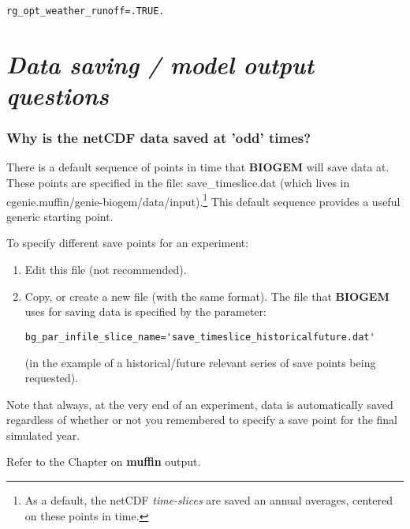 \documentclass[11pt,fleqn]{book} %
\begin{document}
\small\begin{verbatim}
rg_opt_weather_runoff=.TRUE.
\end{verbatim}\normalsize


\newpage


\section{\textit{Data saving / model output questions}}

%
\subsubsection{Why is the netCDF data saved at 'odd' times?}

There is a default sequence of points in time that \textbf{BIOGEM} will save data at. These points are specified in the file: \textsf{\footnotesize save\_timeslice.dat} (which lives in \textsf{\footnotesize cgenie.muffin/genie-biogem/data/input}).\footnote{As a default, the netCDF \textit{time-slices} are saved an annual averages, centered on these points in time.} This default sequence provides a useful generic starting point.

To specify different save points for an experiment:
\begin{enumerate}[noitemsep]
\setlength{\itemindent}{.2in}
\item Edit this file (not recommended).
\item Copy, or create a new file (with the same format). The file that \textbf{BIOGEM} uses for saving data is specified by the parameter:
\small\begin{verbatim}
bg_par_infile_slice_name='save_timeslice_historicalfuture.dat'
\end{verbatim}\normalsize
(in the example of a historical/future relevant series of save points being requested).
\end{enumerate}

Note that always, at the very end of an experiment, data is automatically saved regardless of whether or not you remembered to specify a save point for the final simulated year.

Refer to the Chapter on \textbf{muffin} output.

%
\end{document}

